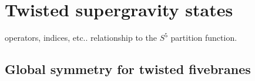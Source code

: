 %
%
%

\section{Twisted supergravity states}

operators, indices, etc..
relationship to the $S^5$ partition function.

%
%
%
%
%

\subsection{Global symmetry for twisted fivebranes}

